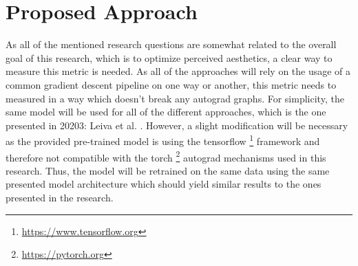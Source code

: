 \documentclass[10pt,a4paper]{scrartcl} %
\begin{document}
\section{Proposed Approach}
\label{sec:approach}
As all of the mentioned research questions are somewhat related to the overall goal of this research, which is to optimize
perceived aesthetics, a clear way to measure this metric is needed. As all of the approaches will rely on the usage of a
common gradient descent pipeline on one way or another, this metric needs to measured in a way which doesn't break any 
autograd graphs. For simplicity, the same model will be used for all of the different approaches, which is the one presented in
20203: Leiva et al. \cite{Leiva2023}. However, a slight modification will be necessary as the provided pre-trained model is
using the tensorflow \footnote{\url{https://www.tensorflow.org}} framework and therefore not compatible with the torch \footnote{\url{https://pytorch.org}}
autograd mechanisms used in this research. Thus, the model will be retrained on the same data using the same presented model architecture
which should yield similar results to the ones presented in the research.
\end{document}
